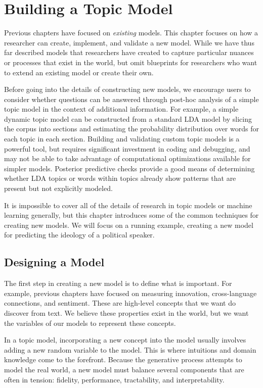 \chapter{Building a Topic Model}
\label{ch:building}

Previous chapters have focused on \emph{existing} models.  This
chapter focuses on how a researcher can create, implement, and
validate a new model.  While we have thus far described
models that researchers have created to capture particular nuances or
processes that exist in the world, but omit blueprints
for researchers who want to extend an existing model or create their own.

Before going into the details of constructing new models, we encourage users to consider whether questions can be answered through post-hoc analysis of a simple topic model in the context of additional information.
For example, a simple dynamic topic model can be constructed from a standard LDA model by slicing the corpus into sections and estimating the probability distribution over words for each topic in each section.
Building and validating custom topic models is a powerful tool, but requires significant investment in coding and debugging, and may not be able to take advantage of computational optimizations available for simpler models.
Posterior predictive checks \citep{mimno-11Bayesian} provide a good means of determining whether LDA topics or words within topics already show patterns that are present but not explicitly modeled.

It is impossible to cover all of the details of research in topic
models or machine learning generally, but this chapter introduces some
of the common techniques for creating new models.  We will focus on a
running example, creating a new model for predicting the
ideology of a political speaker.

\section{Designing a Model}

The first step in creating a new model is to define what is
important.  For example, previous chapters have focused on measuring
innovation, cross-language connections, and sentiment.  These are
high-level concepts that we want do discover from text.  We believe
these properties exist in the world, but we want the variables of our models to represent
these concepts.

In a topic model, incorporating a new concept into the model usually
involves adding a new random variable to the model.  This is where
intuitions and domain knowledge come to the forefront.  Because the
generative process attempts to model the real world, a new model must
balance several components that are often in tension: fidelity,
performance, tractability, and interpretability.

